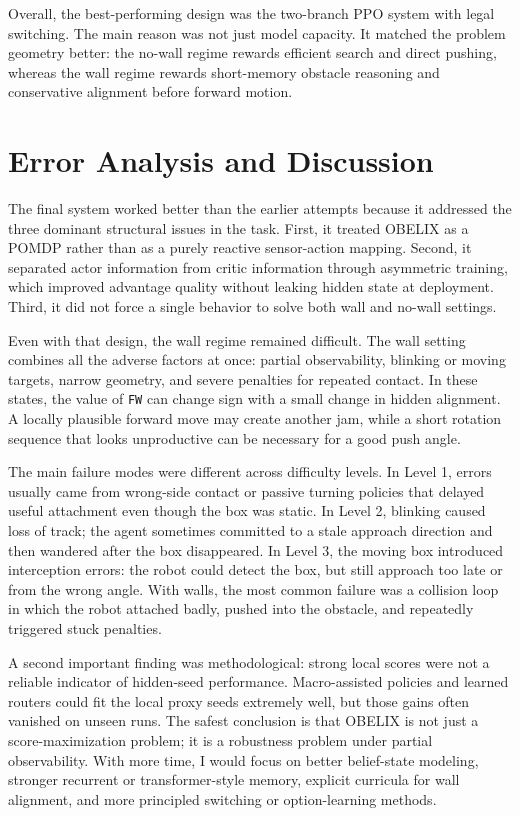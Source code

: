 \documentclass[11pt, oneside]{article}   	%
\begin{document}
Overall, the best-performing design was the two-branch PPO system with legal switching. The main reason was not just model capacity. It matched the problem geometry better: the no-wall regime rewards efficient search and direct pushing, whereas the wall regime rewards short-memory obstacle reasoning and conservative alignment before forward motion.

\section{Error Analysis and Discussion}

The final system worked better than the earlier attempts because it addressed the three dominant structural issues in the task. First, it treated OBELIX as a POMDP rather than as a purely reactive sensor-action mapping. Second, it separated actor information from critic information through asymmetric training, which improved advantage quality without leaking hidden state at deployment. Third, it did not force a single behavior to solve both wall and no-wall settings.

Even with that design, the wall regime remained difficult. The wall setting combines all the adverse factors at once: partial observability, blinking or moving targets, narrow geometry, and severe penalties for repeated contact. In these states, the value of \texttt{FW} can change sign with a small change in hidden alignment. A locally plausible forward move may create another jam, while a short rotation sequence that looks unproductive can be necessary for a good push angle.

The main failure modes were different across difficulty levels. In Level 1, errors usually came from wrong-side contact or passive turning policies that delayed useful attachment even though the box was static. In Level 2, blinking caused loss of track; the agent sometimes committed to a stale approach direction and then wandered after the box disappeared. In Level 3, the moving box introduced interception errors: the robot could detect the box, but still approach too late or from the wrong angle. With walls, the most common failure was a collision loop in which the robot attached badly, pushed into the obstacle, and repeatedly triggered stuck penalties.

A second important finding was methodological: strong local scores were not a reliable indicator of hidden-seed performance. Macro-assisted policies and learned routers could fit the local proxy seeds extremely well, but those gains often vanished on unseen runs. The safest conclusion is that OBELIX is not just a score-maximization problem; it is a robustness problem under partial observability. With more time, I would focus on better belief-state modeling, stronger recurrent or transformer-style memory, explicit curricula for wall alignment, and more principled switching or option-learning methods.
\end{document}

